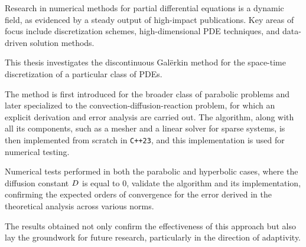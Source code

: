 Research in numerical methods for partial differential equations is a dynamic field, as evidenced by a steady output of high-impact publications. Key areas of focus include discretization schemes, high-dimensional PDE techniques, and data-driven solution methods.

This thesis investigates the discontinuous Galërkin method for the space-time discretization of a particular class of PDEs.

The method is first introduced for the broader class of parabolic problems and later specialized to the convection-diffusion-reaction problem, for which an explicit derivation and error analysis are carried out. The algorithm, along with all its components, such as a mesher and a linear solver for sparse systems, is then implemented from scratch in \lstinline{C++23}, and this implementation is used for numerical testing.

Numerical tests performed in both the parabolic and hyperbolic cases, where the diffusion constant $D$ is equal to $0$, validate the algorithm and its implementation, confirming the expected orders of convergence for the error derived in the theoretical analysis across various norms.

The results obtained not only confirm the effectiveness of this approach but also lay the groundwork for future research, particularly in the direction of adaptivity.